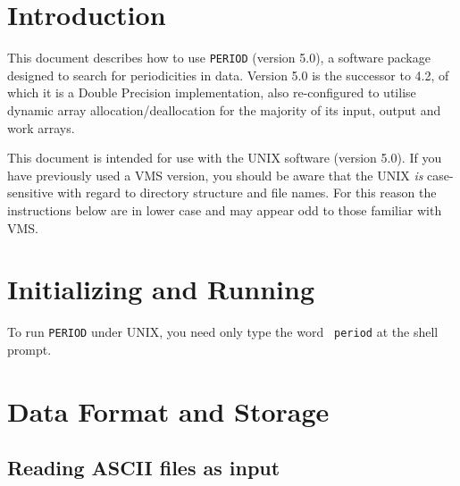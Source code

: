  \begin{latexonly}
   \setlength{\parskip}{0mm}
   \latexonlytoc
   \setlength{\parskip}{\medskipamount}
   \markboth{\stardocname}{\stardocname}
 \end{latexonly}
\newpage
\renewcommand{\thepage}{\arabic{page}}

\section{Introduction}
  
This document describes how to use {\tt PERIOD} (version 5.0), a
software package designed to search for periodicities in data. 
Version 5.0 is the successor to 4.2, of which
it is a Double Precision implementation, also re-configured to utilise
dynamic array allocation/deallocation for the majority of its input,
output and work arrays.

This document is intended for use with the UNIX software (version
5.0). If you have previously used a VMS version, you should be aware
that the UNIX {\em is} case-sensitive with regard to directory
structure and file names.  For this reason the instructions below are
in lower case and may appear odd to those familiar with VMS.

\section{Initializing and Running}
 
To run {\tt PERIOD} under UNIX, you need only type the word {\tt
period} at the shell prompt.

\section{Data Format and Storage}
\label{slots}
 
\subsection{Reading ASCII files as input}
\label{slots1}

